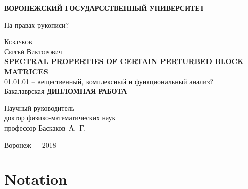 \documentclass[a4paper]{article}
\theoremstyle{definition}
\begin{document}
\begin{center}
  \textbf{ВОРОНЕЖСКИЙ ГОСУДАРССТВЕННЫЙ УНИВЕРСИТЕТ}
\end{center}

\begin{flushright}
  На правах рукописи?
\end{flushright}

\vfill

\begin{center}
  \textsc{\Large
    Козлуков\\
    Сергей Викторович
  }
  \\[1.5cm]
  \textbf{SPECTRAL PROPERTIES OF CERTAIN PERTURBED BLOCK MATRICES}\\[1.5cm]
  01.01.01 -- вещественный, комплексный и функциональный анализ?\\[1.5cm]
  Бакалаврская \textbf{ДИПЛОМНАЯ РАБОТА}
\end{center}

\vfill
\begin{flushright}
  Научный руководитель\\
  доктор физико-математических наук\\
  профессор Баскаков~А.~Г.
\end{flushright}
 
\vfill
\begin{center}
  Воронеж~--~2018
\end{center}

\pagestyle{empty}
\newpage

\setcounter{tocdepth}{2}
\tableofcontents
\newpage


\section*{Notation}
\end{document}
